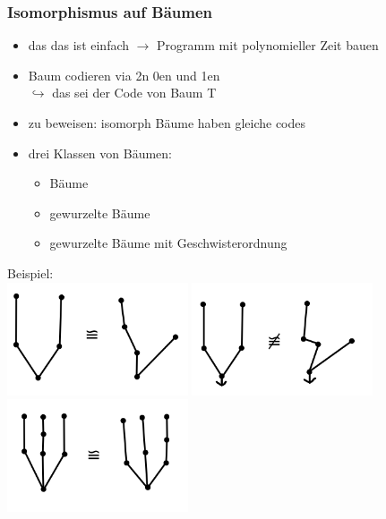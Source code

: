\subsubsection{Isomorphismus auf Bäumen}
\begin{itemize}
	\item das \glqq das ist einfach\grqq{} $\rightarrow$ Programm mit polynomieller Zeit bauen
	\item Baum codieren via 2n 0en und 1en\\
\hspace*{2cm}$\hookrightarrow$ das sei der Code von Baum T
	\item zu beweisen: isomorph Bäume haben gleiche codes
	\item drei Klassen von Bäumen:
	\begin{itemize}
		\item Bäume
		\item gewurzelte Bäume
		\item gewurzelte Bäume mit Geschwisterordnung
	\end{itemize}
\end{itemize}
\newpage

Beispiel:\\
\includegraphics[width=0.4\textwidth]{lectures/161028/pix/graph1.png}
\includegraphics[width=0.4\textwidth]{lectures/161028/pix/graph2.png}\\
\includegraphics[width=0.4\textwidth]{lectures/161028/pix/graph3.png}\\

